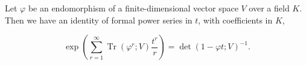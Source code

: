 Let $\varphi$ be an endomorphism of a finite-dimensional vector space $V$ over a field $K$. Then we have an identity of formal power series in $t$, with coefficients in $K$,

$$\exp \left( \sum_{r=1}^{\infty} \operatorname{Tr}(\varphi^r; V) \frac{t^r}{r} \right) = \det(1 - \varphi t; V)^{-1}.$$
